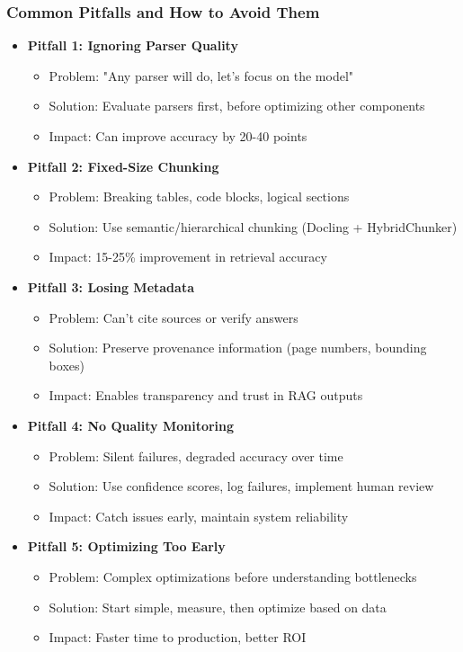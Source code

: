 \begin{frame}[fragile]\frametitle{Common Pitfalls and How to Avoid Them}
      \begin{itemize}
        \item \textbf{Pitfall 1: Ignoring Parser Quality}
        \begin{itemize}
            \item Problem: "Any parser will do, let's focus on the model"
            \item Solution: Evaluate parsers first, before optimizing other components
            \item Impact: Can improve accuracy by 20-40 points
        \end{itemize}
        \item \textbf{Pitfall 2: Fixed-Size Chunking}
        \begin{itemize}
            \item Problem: Breaking tables, code blocks, logical sections
            \item Solution: Use semantic/hierarchical chunking (Docling + HybridChunker)
            \item Impact: 15-25\% improvement in retrieval accuracy
        \end{itemize}
        \item \textbf{Pitfall 3: Losing Metadata}
        \begin{itemize}
            \item Problem: Can't cite sources or verify answers
            \item Solution: Preserve provenance information (page numbers, bounding boxes)
            \item Impact: Enables transparency and trust in RAG outputs
        \end{itemize}
        \item \textbf{Pitfall 4: No Quality Monitoring}
        \begin{itemize}
            \item Problem: Silent failures, degraded accuracy over time
            \item Solution: Use confidence scores, log failures, implement human review
            \item Impact: Catch issues early, maintain system reliability
        \end{itemize}
        \item \textbf{Pitfall 5: Optimizing Too Early}
        \begin{itemize}
            \item Problem: Complex optimizations before understanding bottlenecks
            \item Solution: Start simple, measure, then optimize based on data
            \item Impact: Faster time to production, better ROI
        \end{itemize}
      \end{itemize}
\end{frame}

